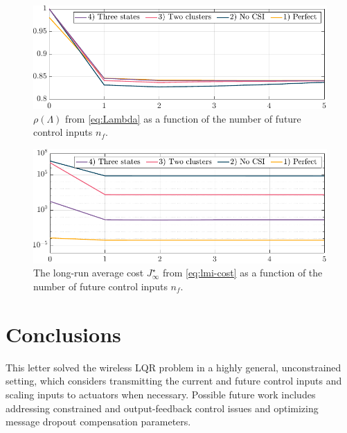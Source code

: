 \documentclass[journal,twoside,web]{ieeecolor}
\begin{document}
\begin{figure}
\begin{center}
\vspace{1.8mm}
\includegraphics[width=\columnwidth]{./stability-cntrl-3.pdf}
\caption{$\rho(\mathit{\Lambda})$ from \eqref{eq:Lambda} as a function of the number of future control inputs $n_f$.}\label{fig:stability}
\end{center}
\end{figure}
\begin{figure}
\begin{center}
\vspace{-1.5mm}
\includegraphics[width=\columnwidth]{./cost-cntrl-3.pdf}
\caption{The long-run average cost $J_{\infty}^{\star}$ from \eqref{eq:lmi-cost} as a function of the number of future control inputs $n_f$.}\label{fig:cost}
\vspace{-2mm}
\end{center}
\end{figure}

\section{Conclusions}\label{sec:conclusions}
This letter solved the wireless LQR %
problem in a highly general, unconstrained setting, which considers transmitting the current and future control inputs and scaling inputs to actuators when necessary. Possible future work includes addressing constrained and output-feedback control issues and optimizing message dropout compensation parameters.



\end{document}
